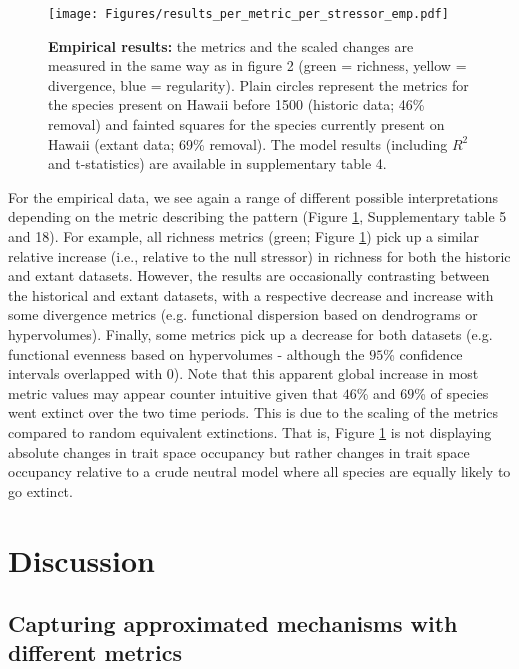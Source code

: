 \documentclass[12pt,letterpaper]{article}
\begin{document}
\begin{figure}[!htbp]
\centering
   \texttt{[image: Figures/results\_per\_metric\_per\_stressor\_emp.pdf]}
\caption{\scriptsize{\textbf{Empirical results:} the metrics and the scaled changes are measured in the same way as in figure 2 (green = richness, yellow = divergence, blue = regularity).
Plain circles represent the metrics for the species present on Hawaii before 1500 (historic data; 46\% removal) and fainted squares for the species currently present on Hawaii (extant data; 69\% removal).
The model results (including $R^{2}$ and t-statistics) are available in supplementary table 4.
}}
\label{Fig:empirical_results}
\end{figure}
\bigskip

For the empirical data, we see again a range of different possible interpretations depending on the metric describing the pattern (Figure \ref{Fig:empirical_results}, Supplementary table 5 and 18).
For example, all richness metrics (green; Figure \ref{Fig:empirical_results}) pick up a similar relative increase (i.e., relative to the null stressor) in richness for both the historic and extant datasets.
However, the results are occasionally contrasting between the historical and extant datasets, with a respective decrease and increase with some divergence metrics (e.g. functional dispersion based on dendrograms or hypervolumes).
Finally, some metrics pick up a decrease for both datasets (e.g. functional evenness based on hypervolumes - although the $95$\% confidence intervals overlapped with $0$).
Note that this apparent global increase in most metric values may appear counter intuitive given that $46$\% and $69$\% of species went extinct over the two time periods.
This is due to the scaling of the metrics compared to random equivalent extinctions.
That is, Figure \ref{Fig:empirical_results} is not displaying absolute changes in trait space occupancy but rather changes in trait space occupancy relative to a crude neutral model where all species are equally likely to go extinct.

\section{Discussion}

\subsection{Capturing approximated mechanisms with different metrics}
\end{document}
